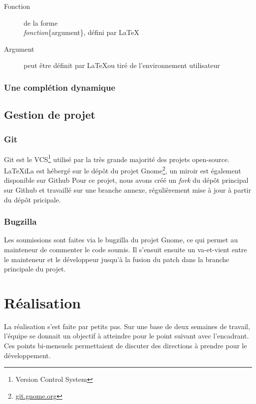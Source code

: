 \documentclass[a4paper,11pt]{report}
\begin{document}
\begin{description}
  \item[Fonction] de la forme \\\textit{fonction}\{argument\}, défini par \LaTeX
  \item[Argument] peut être définit par \LaTeX  ou tiré de l'environnement utilisateur
\end{description}

\subsection{Une complétion dynamique}
\label{sub:completion_dyn}


\section{Gestion de projet} %

\subsection{Git}
\label{sub:git}
Git est le VCS\footnote{Version Control System} utilisé par la très grande majorité des projets open-source. LaTeXiLa est hébergé sur le dépôt du projet Gnome\footnote{\url{git.gnome.org}}, un miroir est également disponible sur Github %
Pour ce projet, nous avons créé un \textit{fork} du dépôt principal sur Github et travaillé sur une branche annexe, régulièrement mise à jour à partir du dépôt pricipale.

\subsection{Bugzilla}
Les soumissions sont faites via le bugzilla du projet Gnome, ce qui permet au mainteneur de commenter le code soumis.
Il s'ensuit ensuite un va-et-vient entre le mainteneur et le développeur jusqu'à la fusion du patch dans la branche principale du projet.

\chapter{Réalisation}
La réalisation s'est faite par petits pas. Sur une base de deux semaines de travail, l'équipe se donnait un objectif à atteindre pour le point suivant avec l'encadrant.
Ces points bi-mensuels permettaient de discuter des directions à prendre pour le développement.
\end{document}
